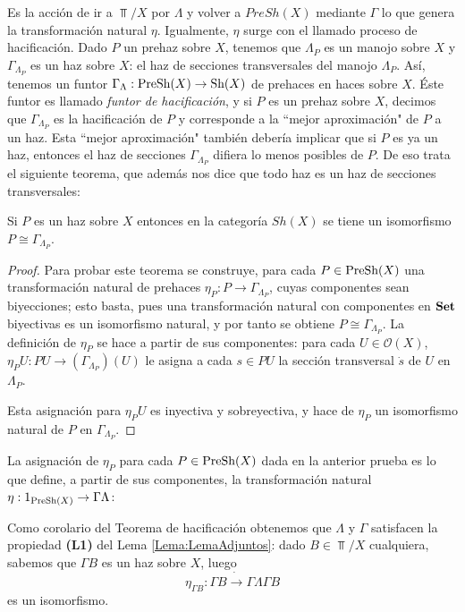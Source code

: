 Es la acción de ir a $\Top/X$ por $\Lambda$ y volver a $PreSh(X)$ mediante $\Gamma$ lo que genera la transformación natural $\eta$. Igualmente, $\eta$ surge con el llamado proceso de hacificación. Dado $P$ un prehaz sobre $X$, tenemos que $\Lambda_P$ es un manojo sobre $X$ y $\Gamma_{\Lambda_P}$ es un haz sobre $X$: el haz de secciones transversales del manojo $\Lambda_P$. Así, tenemos un funtor $\Gamma_\Lambda: \normalfont{\text{PreSh}}(X)\to\normalfont{\text{Sh}}(X)$ de prehaces en haces sobre $X$. Éste funtor es llamado \textit{funtor de hacificación}, y si $P$ es un prehaz sobre $X$, decimos que $\Gamma_{\Lambda_P}$ es la hacificación de $P$ y corresponde a la ``mejor aproximación" de $P$ a un haz. Esta ``mejor aproximación" también debería implicar que si $P$ es ya un haz, entonces el haz de secciones $\Gamma_{\Lambda_P}$ difiera lo menos posibles de $P$. De eso trata el siguiente teorema, que además nos dice que todo haz es un haz de secciones transversales:
\begin{Tma}
   Si $P$ es un haz sobre $X$ entonces en la categoría $Sh(X)$ se tiene un isomorfismo $P\cong \Gamma_{\Lambda_P}$.
\end{Tma}
\begin{proof}
   Para probar este teorema se construye, para cada $P\in \normalfont{\text{PreSh}}(X)$ una transformación natural de prehaces $\eta_{P}:P\to\Gamma_{\Lambda_P}$, cuyas componentes sean biyecciones; esto basta, pues una transformación natural con componentes en $\normalfont{\textbf{Set}}$ biyectivas es un isomorfismo natural, y por tanto se obtiene $P\cong \Gamma_{\Lambda_P}$. La definición de $\eta_P$ se hace a partir de sus componentes: para cada $U\in \mathcal{O}(X)$, $\eta_{P} U:PU\to (\Gamma_{\Lambda_P})(U)$ le asigna a cada $s\in PU$ la sección transversal $\dot{s}$ de $U$ en $\Lambda_P$.
   
   Esta asignación para $\eta_{P}U$ es inyectiva y sobreyectiva, y hace de $\eta_P$ un isomorfismo natural de $P$ en $\Gamma_{\Lambda_P}$.
\end{proof}
La asignación de $\eta_P$ para cada $P\in \normalfont{\text{PreSh}} (X)$ dada en la anterior prueba es lo que define, a partir de sus componentes, la transformación natural $\eta :1_{\normalfont{\text{PreSh}}(X)}\to \Gamma \Lambda$:

Como corolario del Teorema de hacificación obtenemos que $\Lambda$ y $\Gamma$ satisfacen la propiedad \textbf{(L1)} del Lema \ref{Lema:LemaAdjuntos}: dado $B\in \Top/X$ cualquiera, sabemos que $\Gamma B$ es un haz sobre $X$, luego 
$$
   \eta_{\Gamma B}:\Gamma B\dot{\to}\Gamma \Lambda \Gamma B
$$
es un isomorfismo. 
